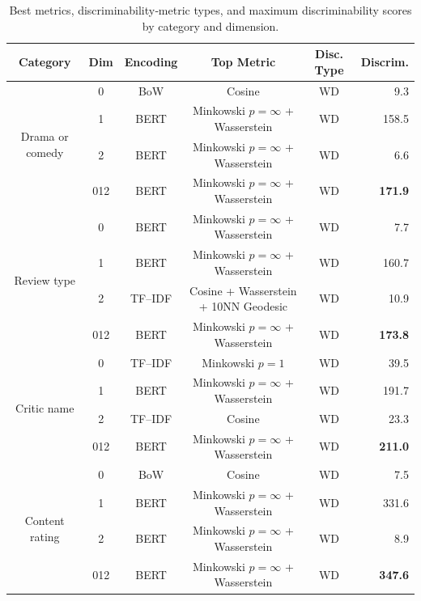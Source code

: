 \documentclass[fleqn,10pt]{SelfArx}
\begin{document}
\begin{table}[t]
  \centering
  \begin{tabular}{cccccr}
    \toprule
    \textbf{Category} & \textbf{Dim} & \textbf{Encoding} & \textbf{Top Metric} & \textbf{Disc. Type} & \textbf{Discrim.} \\
    \midrule
    \multirow{4}{*}{Drama or comedy}
     & 0   & BoW   & Cosine                                    & WD &  9.3   \\
     & 1   & BERT  & Minkowski $p=\infty$ + Wasserstein        & WD & 158.5  \\
     & 2   & BERT  & Minkowski $p=\infty$ + Wasserstein        & WD &   6.6  \\
     & 012 & BERT  & Minkowski $p=\infty$ + Wasserstein        & WD & \textbf{171.9} \\ 
    \midrule
    \multirow{4}{*}{Review type}
     & 0   & BERT   & Minkowski $p=\infty$ + Wasserstein       & WD &   7.7  \\
     & 1   & BERT   & Minkowski $p=\infty$ + Wasserstein       & WD & 160.7  \\
     & 2   & TF–IDF & Cosine + Wasserstein + 10NN Geodesic       & WD &  10.9  \\
     & 012 & BERT   & Minkowski $p=\infty$ + Wasserstein       & WD & \textbf{173.8} \\
    \midrule
    \multirow{4}{*}{Critic name}
     & 0   & TF–IDF & Minkowski $p=1$                            & WD &  39.5  \\
     & 1   & BERT   & Minkowski $p=\infty$ + Wasserstein        & WD & 191.7  \\
     & 2   & TF–IDF & Cosine                                    & WD &  23.3  \\
     & 012 & BERT   & Minkowski $p=\infty$ + Wasserstein        & WD & \textbf{211.0} \\
    \midrule
    \multirow{4}{*}{Content rating}
     & 0   & BoW    & Cosine                                    & WD &   7.5  \\
     & 1   & BERT   & Minkowski $p=\infty$ + Wasserstein        & WD & 331.6  \\
     & 2   & BERT   & Minkowski $p=\infty$ + Wasserstein        & WD &   8.9  \\
     & 012 & BERT   & Minkowski $p=\infty$ + Wasserstein        & WD & \textbf{347.6} \\
    \bottomrule
  \end{tabular}
  \caption{Best metrics, discriminability‐metric types, and maximum discriminability scores by category and dimension.}
  \label{tab:best-metrics}
\end{table}
\end{document}
